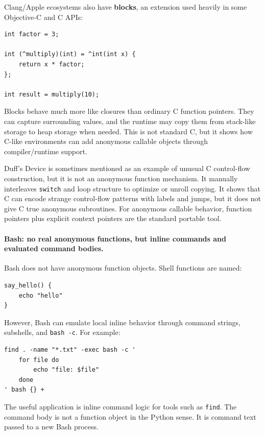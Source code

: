 Clang/Apple ecosystems also have \textbf{blocks}, an extension used heavily in some Objective-C and C APIs:

\begin{verbatim}
int factor = 3;

int (^multiply)(int) = ^int(int x) {
    return x * factor;
};

int result = multiply(10);
\end{verbatim}

Blocks behave much more like closures than ordinary C function pointers. They can capture surrounding values, and the runtime may copy them from stack-like storage to heap storage when needed. This is not standard C, but it shows how C-like environments can add anonymous callable objects through compiler/runtime support.

Duff's Device is sometimes mentioned as an example of unusual C control-flow construction, but it is not an anonymous function mechanism. It manually interleaves \texttt{switch} and loop structure to optimize or unroll copying. It shows that C can encode strange control-flow patterns with labels and jumps, but it does not give C true anonymous subroutines. For anonymous callable behavior, function pointers plus explicit context pointers are the standard portable tool.

\paragraph{Bash: no real anonymous functions, but inline commands and evaluated command bodies.}

Bash does not have anonymous function objects. Shell functions are named:

\begin{verbatim}
say_hello() {
    echo "hello"
}
\end{verbatim}

However, Bash can emulate local inline behavior through command strings, subshells, and \texttt{bash -c}. For example:

\begin{verbatim}
find . -name "*.txt" -exec bash -c '
    for file do
        echo "file: $file"
    done
' bash {} +
\end{verbatim}

The useful application is inline command logic for tools such as \texttt{find}. The command body is not a function object in the Python sense. It is command text passed to a new Bash process.

